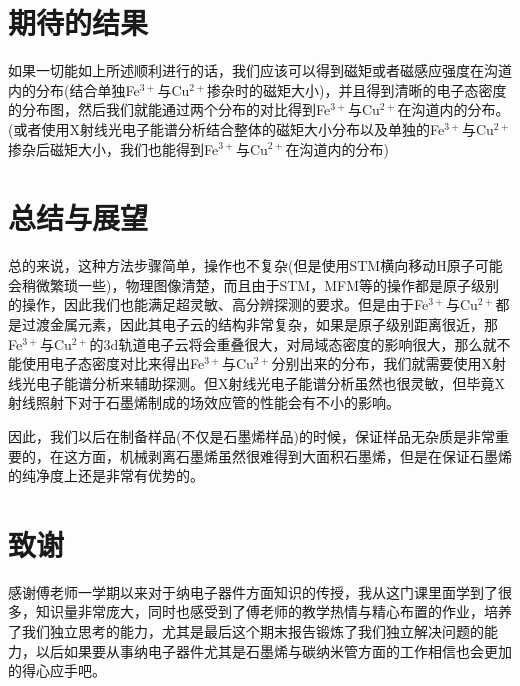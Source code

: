 \documentclass{phyasgn}\usepackage{nag}
\begin{document}
\section{期待的结果}
\par 如果一切能如上所述顺利进行的话，我们应该可以得到磁矩或者磁感应强度在沟道内的分布(结合单独Fe$^{3+}$与Cu$^{2+}$掺杂时的磁矩大小)，并且得到清晰的电子态密度的分布图，然后我们就能通过两个分布的对比得到Fe$^{3+}$与Cu$^{2+}$在沟道内的分布。(或者使用X射线光电子能谱分析结合整体的磁矩大小分布以及单独的Fe$^{3+}$与Cu$^{2+}$掺杂后磁矩大小，我们也能得到Fe$^{3+}$与Cu$^{2+}$在沟道内的分布)
\section{总结与展望}
\par 总的来说，这种方法步骤简单，操作也不复杂(但是使用STM横向移动H原子可能会稍微繁琐一些)，物理图像清楚，而且由于STM，MFM等的操作都是原子级别的操作，因此我们也能满足超灵敏、高分辨探测的要求。但是由于Fe$^{3+}$与Cu$^{2+}$都是过渡金属元素，因此其电子云的结构非常复杂，如果是原子级别距离很近，那Fe$^{3+}$与Cu$^{2+}$的3d轨道电子云将会重叠很大，对局域态密度的影响很大，那么就不能使用电子态密度对比来得出Fe$^{3+}$与Cu$^{2+}$分别出来的分布，我们就需要使用X射线光电子能谱分析来辅助探测。但X射线光电子能谱分析虽然也很灵敏，但毕竟X射线照射下对于石墨烯制成的场效应管的性能会有不小的影响。
\par 因此，我们以后在制备样品(不仅是石墨烯样品)的时候，保证样品无杂质是非常重要的，在这方面，机械剥离石墨烯虽然很难得到大面积石墨烯，但是在保证石墨烯的纯净度上还是非常有优势的。
\section{致谢}
\par 感谢傅老师一学期以来对于纳电子器件方面知识的传授，我从这门课里面学到了很多，知识量非常庞大，同时也感受到了傅老师的教学热情与精心布置的作业，培养了我们独立思考的能力，尤其是最后这个期末报告锻炼了我们独立解决问题的能力，以后如果要从事纳电子器件尤其是石墨烯与碳纳米管方面的工作相信也会更加的得心应手吧。
\printbibliography[heading=bibintoc]
\end{document}
